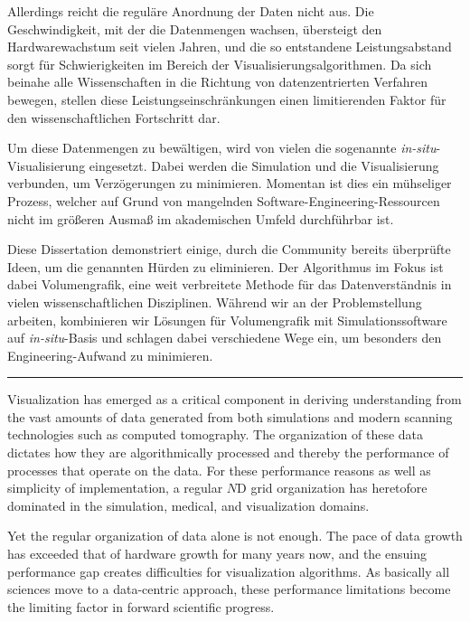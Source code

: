 Allerdings reicht die regul\"are Anordnung der Daten nicht aus. Die
Geschwindigkeit, mit der die Datenmengen wachsen, \"ubersteigt
den Hardwarewachstum seit vielen Jahren, und die so entstandene
Leistungsabstand sorgt f\"ur Schwierigkeiten im Bereich der
Visualisierungsalgorithmen. Da sich beinahe alle Wissenschaften in
die Richtung von datenzentrierten Verfahren bewegen, stellen diese
Leistungseinschr\"ankungen einen limitierenden Faktor f\"ur den
wissenschaftlichen Fortschritt dar.

Um diese Datenmengen zu bew\"altigen, wird von vielen die sogenannte
\textit{in-situ}-Visualisierung eingesetzt. Dabei werden die
Simulation und die Visualisierung verbunden, um Verz\"ogerungen zu
minimieren. Momentan ist dies ein m\"uhseliger Prozess, welcher auf
Grund von mangelnden
Software-Engineering-Ressourcen nicht im gr\"o\ss{}eren Ausma\ss{} im
akademischen Umfeld durchf\"uhrbar ist.

Diese Dissertation demonstriert einige, durch die Community bereits
\"uberpr\"ufte Ideen, um die genannten H\"urden zu eliminieren. Der
Algorithmus im Fokus ist dabei Volumengrafik, eine weit verbreitete
Methode f\"ur das Datenverst\"andnis in vielen wissenschaftlichen
Disziplinen. W\"ahrend wir an der Problemstellung arbeiten, kombinieren
wir L\"osungen f\"ur Volumengrafik mit
Simulationssoftware auf \textit{in-situ}-Basis und schlagen dabei
verschiedene Wege ein, um besonders den Engineering-Aufwand zu
minimieren.


\vspace{1em}

\hrule{}
\vspace{1em}

Visualization has emerged as a critical component in deriving
understanding from the vast amounts of data generated from both
simulations and modern scanning technologies such as computed
tomography.  The organization of these data dictates how they are
algorithmically processed and thereby the performance of processes
that operate on the data.  For these performance reasons as well as
simplicity of implementation, a regular $N$D grid organization has
heretofore dominated in the simulation, medical, and visualization
domains.

Yet the regular organization of data alone is not enough.  The pace of
data growth has exceeded that of hardware growth for many years now,
and the ensuing performance gap creates difficulties for visualization
algorithms.  As basically all sciences move to a data-centric approach,
these performance limitations become the limiting factor in forward
scientific progress.

